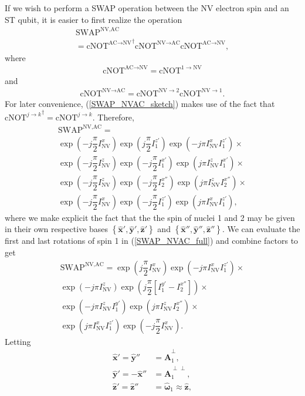 \documentclass[twocolumn]{revtex4}
\renewcommand{\t}{\text} %
\newcommand{\f}[2]{\dfrac{#1}{#2}} %
\newcommand{\p}[1]{\left(#1\right)} %
\renewcommand{\sp}[1]{\left[#1\right]} %
\renewcommand{\set}[1]{\left\{#1\right\}} %
\renewcommand{\v}{\bm} %
\newcommand{\uv}[1]{\hat{\v{#1}}} %
\newcommand{\SWAP}{\t{SWAP}}
\newcommand{\cNOT}{\t{cNOT}}
\newcommand{\NV}{\t{NV}}
\newcommand{\AC}{\t{AC}}
\begin{document}
If we wish to perform a SWAP operation between the NV electron spin
and an ST qubit, it is easier to first realize the operation
\begin{multline}
  \SWAP^{\NV,\AC} \\
  = {\cNOT^{\AC\to\NV}}^\dagger\cNOT^{\NV\to\AC}\cNOT^{\AC\to\NV},
  \label{SWAP_NVAC_sketch}
\end{multline}
where
\begin{align}
  \cNOT^{\AC\to\NV} = \cNOT^{1\to\NV}
\end{align}
and
\begin{align}
  \cNOT^{\NV\to\AC} = \cNOT^{\NV\to2}\cNOT^{\NV\to1}.
\end{align}
For later convenience, (\ref{SWAP_NVAC_sketch}) makes use of the fact
that ${\cNOT^{j\to k}}^\dagger=\cNOT^{j\to k}$. Therefore,
\begin{multline}
  \SWAP^{\NV,\AC} = \\
  \exp\p{-j\f\pi2 I_\NV^x} \exp\p{j\f\pi2 I_1^{z'}}
  \exp\p{-j\pi I_\NV^x I_1^{z'}}
  \times \\
  \exp\p{-j\f\pi2 I_\NV^z} \exp\p{-j\f\pi2 I_1^{x'}}
  \exp\p{j\pi I_\NV^z I_1^{x'}}
  \times \\
  \exp\p{-j\f\pi2 I_\NV^z} \exp\p{-j\f\pi2 I_2^{x''}}
  \exp\p{j\pi I_\NV^zI_2^{x''}}
  \times \\
  \exp\p{-j\f\pi2 I_\NV^x} \exp\p{-j\f\pi2 I_1^{z'}}
  \exp\p{j\pi I_\NV^x I_1^{z'}},
  \label{SWAP_NVAC_full}
\end{multline}
where we make explicit the fact that the the spin of nuclei 1 and 2
may be given in their own respective bases
$\set{\uv x',\uv y',\uv z'}$ and $\set{\uv x'',\uv y'',\uv z''}$. We
can evaluate the first and last rotations of spin 1 in
(\ref{SWAP_NVAC_full}) and combine factors to get
\begin{multline}
  \SWAP^{\NV,\AC} = \exp\p{j\f\pi2 I_\NV^x}
  \exp\p{-j\pi I_\NV^x I_1^{z'}}
  \times \\
  \exp\p{-j\pi I_\NV^z}
  \exp\p{j\f\pi2\sp{I_1^{y'}-I_2^{x''}}}
  \times \\
  \exp\p{-j\pi I_\NV^z I_1^{y'}}
  \exp\p{j\pi I_\NV^z I_2^{x''}}
  \times \\
  \exp\p{j\pi I_\NV^x I_1^{z'}}
  \exp\p{-j\f\pi2 I_\NV^x}.
\end{multline}
Letting
\begin{align}
  \uv x' = \uv y'' &= \uv A_1^\perp, \\
  \uv y' = -\uv x'' &= \uv A_1^{\perp\perp}, \\
  \uv z' = \uv z'' &= \uv\omega_1\approx\uv z, \label{w=z}
\end{align}
\end{document}
